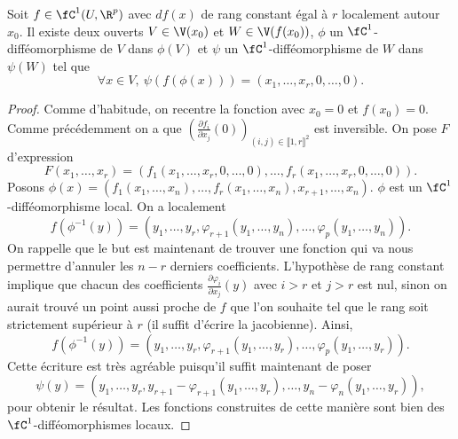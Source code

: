 \documentclass[10pt,a4paper]{article}
\begin{document}
    \begin{prop}
      Soit $f \in \fC^1(U,\R^p)$ avec $df(x)$ de rang constant égal à $r$ localement autour $x_0$. Il existe deux ouverts $V \in \V(x_0)$ et $W \in \V(f(x_0))$, $\phi$ un $\fC^1$-difféomorphisme de $V$ dans $\phi(V)$ et $\psi$ un $\fC^1$-difféomorphisme de $W$ dans $\psi(W)$ tel que
\[\forall x \in V, \ \psi(f(\phi(x))) = (x_1,\dots,x_r,0,\dots,0).\]
    \end{prop}
\begin{proof}
Comme d'habitude, on recentre la fonction avec $x_0 = 0$ et $f(x_0) = 0$.
Comme précédemment on a que $(\frac{\partial f_i}{\partial x_j}(0))_{(i,j) \in \llbracket 1,r \rrbracket^2}$ est inversible. On pose $F$ d'expression
\[F(x_1,\dots,x_r) = (f_1(x_1,\dots,x_r,0, \dots,0),\dots,f_r(x_1,\dots,x_r,0,\dots,0)).\]
Posons $\phi(x) = (f_1(x_1,\dots,x_n),\dots,f_r(x_1,\dots,x_n),x_{r+1},\dots,x_n).$ $\phi$ est un $\fC^1$-difféomorphisme local. On a localement
\[ f(\phi^{-1}(y)) = (y_1,\dots,y_r,\varphi_{r+1}(y_1,\dots,y_n),\dots,\varphi_p(y_1,\dots,y_n)).\]
On rappelle que le but est maintenant de trouver une fonction qui va nous permettre d'annuler les $n-r$ derniers coefficients. L'hypothèse de rang constant implique que chacun des coefficients $\frac{\partial \varphi_i}{\partial x_j}(y)$ avec $i>r$ et $j>r$ est nul, sinon on aurait trouvé un point aussi proche de $f$ que l'on souhaite tel que le rang soit strictement supérieur à $r$ (il suffit d'écrire la jacobienne). Ainsi,
\[ f(\phi^{-1}(y)) = (y_1,\dots,y_r,\varphi_{r+1}(y_1,\dots,y_r),\dots,\varphi_p(y_1,\dots,y_r)).\]
Cette écriture est très agréable puisqu'il suffit maintenant de poser
\[\psi(y) = (y_1,\dots,y_r,y_{r+1} - \varphi_{r+1}(y_1,\dots,y_r),\dots, y_{n} - \varphi_{n}(y_1,\dots,y_r)),\]
pour obtenir le résultat. Les fonctions construites de cette manière sont bien des $\fC^1$-difféomorphismes locaux.
\end{proof}
  
\end{document}
